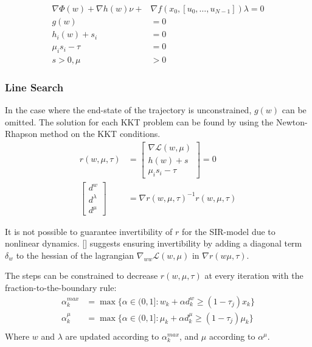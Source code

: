 \begin{align}
        \nabla \Phi(w) + \nabla h(w)\nu + &\nabla f(x_0, [u_0, \dots, u_{N-1}])\lambda = 0 \nonumber \\ 
        g(w) &= 0\nonumber \label{eq:KKT_approx_IPOPT}\\
    h_i(w) + s_i &= 0\\\nonumber
    \mu_is_i-\tau &= 0\\\nonumber
    s > 0, \mu &> 0
\end{align}

\subsubsection{Line Search}
In the case where the end-state of the trajectory is unconstrained, $g(w)$ can be omitted. The solution for each KKT problem can be found by using the Newton-Rhapson method on the KKT conditions. 
\begin{align}
    r(w, \mu, \tau) &= \begin{bmatrix}
    \nabla \mathcal{L}(w, \mu)\\
    h(w) + s\\
    \mu_is_i - \tau
    \end{bmatrix} = 0\\
    \begin{bmatrix}
    d^w\\d^\lambda\\d^\mu
    \end{bmatrix} &= \nabla r(w, \mu, \tau)^{-1} r(w, \mu, \tau)
\end{align}

It is not possible to guarantee invertibility of $r$ for the SIR-model due to nonlinear dynamics. [\cite{IPOPT_output_ref}] suggests ensuring invertibility by adding a diagonal term $\delta_w$ to the hessian of the lagrangian $\nabla_{ww}\mathcal{L}(w, \mu)$ in $\nabla r(w\mu, \tau)$.

The steps can be constrained to decrease $r(w, \mu, \tau)$ at every iteration with the fraction-to-the-boundary rule:
\begin{align}
    \alpha_k^{max} &= \max \{\alpha \in (0,1]: w_k + \alpha d_k^w \geq (1-\tau_j)x_k\}\\
     \alpha_k^{\mu} &= \max \{\alpha \in (0,1]: \mu_k + \alpha d_k^\mu \geq (1-\tau_j)\mu_k\}\\
\end{align}
Where $w$ and $\lambda$ are updated according to $\alpha_k^{max}$, and $\mu$ according to $\alpha^\mu$.



